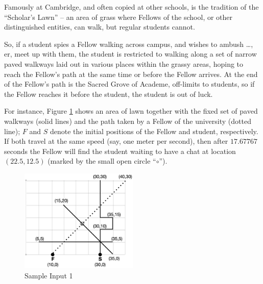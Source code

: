 
Famously at Cambridge, and often copied at other schools, is the tradition of the ``Scholar's Lawn'' -- an area of grass where Fellows of the school, or other distinguished entities, can walk, but regular students cannot.

So, if a student spies a Fellow walking across campus, and wishes to ambush \ldots, er, meet up with them, the student is restricted to walking along a set of narrow paved walkways laid out in various places within the grassy areas, hoping to reach the Fellow's path at the same time or before the Fellow arrives. At the end of the Fellow's path is the Sacred Grove of Academe, off-limits to students, so if the Fellow reaches it before the student, the student is out of luck.

For instance, Figure \ref{fig:paths} shows an area of lawn together with the fixed set of paved walkways (solid lines) and the path taken by a Fellow of the university (dotted line); $F$ and $S$ denote the initial positions of the Fellow and student, respectively. If both travel at the same speed (say, one meter per second), then after $17.67767$ seconds the Fellow will find the student waiting to have a chat at location $(22.5,12.5)$ (marked by the small open circle ``{\Large $\circ$}'').

\begin{figure}[!h]
\centering
\includegraphics[width=0.5\textwidth]{lawn.png}
\caption{Sample Input 1}
\label{fig:paths}
\end{figure}

